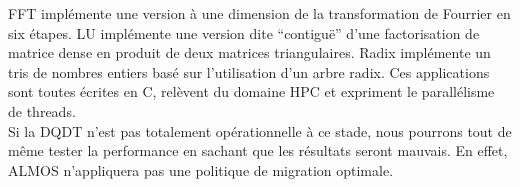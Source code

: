     FFT implémente une version à une dimension de la transformation de Fourrier
    en six étapes. LU implémente une version dite ``contiguë'' d’une
    factorisation de matrice dense en produit de deux matrices
    triangulaires. Radix implémente un tris de nombres entiers basé sur
    l’utilisation d’un arbre radix. Ces applications sont toutes écrites en C,
    relèvent du domaine HPC et expriment le parallélisme de threads.\\

    Si la DQDT n'est pas totalement opérationnelle à ce stade, nous pourrons
    tout de même tester la performance en sachant que les résultats seront
    mauvais. En effet, ALMOS n'appliquera pas une politique de migration
    optimale.

